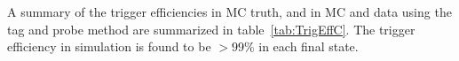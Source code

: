 

A summary of the trigger efficiencies in MC truth, and in MC and data using the tag and probe method are summarized in table~\ref{tab:TrigEffC}. The trigger efficiency in simulation is found to be $>99\%$ in each final state.

